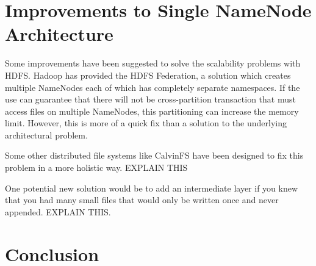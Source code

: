 \documentclass[11pt, a4paper]{article}
\begin{document}
\begin{multicols*}{2}
\section{Improvements to Single NameNode Architecture}\label{Improvements}




% 

% 

Some improvements have been suggested to solve the scalability problems with HDFS. Hadoop has provided the HDFS Federation, a solution which creates multiple NameNodes each of which has completely separate namespaces. If the use can guarantee that there will not be cross-partition transaction that must access files on multiple NameNodes, this partitioning can increase the memory limit. However, this is more of a quick fix than a solution to the underlying architectural problem. 

Some other distributed file systems like CalvinFS have been designed to fix this problem in a more holistic way. EXPLAIN THIS 

One potential new solution would be to add an intermediate layer if you knew that you had many small files that would only be written once and never appended. 
EXPLAIN THIS.

\section{Conclusion}



\end{multicols*}
\end{document}
